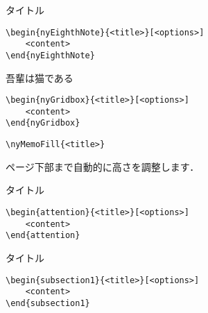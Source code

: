 \documentclass[xelatex,ja=standard,b5j,8pt,magstyle=nomag*,japaram={units}]{bxjsarticle}
\begin{document}
\begin{multicols}{2}
\begin{nyEighthNote}{タイトル}
\end{nyEighthNote}
\columnbreak
\begin{lstlisting}
\begin{nyEighthNote}{<title>}[<options>]
    <content>
\end{nyEighthNote}
\end{lstlisting}
\end{multicols}

\begin{multicols}{2}
\begin{nyGridbox}{吾輩は猫である}
\end{nyGridbox}
\columnbreak
\begin{lstlisting}
\begin{nyGridbox}{<title>}[<options>]
    <content>
\end{nyGridbox}
\end{lstlisting}
\end{multicols}

\begin{multicols}{2}
\columnbreak
\begin{lstlisting}
\nyMemoFill{<title>}
\end{lstlisting}
ページ下部まで自動的に高さを調整します．
\end{multicols}

\newpage

\begin{multicols}{2}
\begin{attention}{タイトル}
\end{attention}
\columnbreak
\begin{lstlisting}
\begin{attention}{<title>}[<options>]
    <content>
\end{attention}
\end{lstlisting}
\end{multicols}

\begin{multicols}{2}
\begin{subsection1}{タイトル}
\end{subsection1}
\columnbreak
\begin{lstlisting}
\begin{subsection1}{<title>}[<options>]
    <content>
\end{subsection1}
\end{lstlisting}
\end{multicols}
\end{document}
